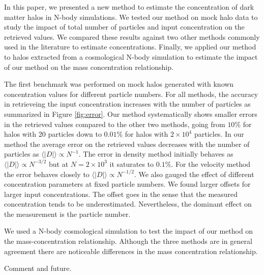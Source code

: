 \documentclass{emulateapj}
\begin{document}
In this paper, we presented a new method to estimate the
concentration of dark matter halos in N-body simulations. 
We tested our method on mock halo data to study the impact of total
number of particles and input concentration on the retrieved values.
We compared these results against two other methods commonly used in
the literature to estimate concentrations.
Finally, we applied our method to halos extracted from a cosmological
N-body simulation to estimate the impact of our method on the mass
concentration relationship. 


The first benchmark was performed on mock halos generated with known
concentration values for different particle numbers. 
For all methods, the accuracy in retrieveing the input concentration
increases with the number of particles as summarized in Figure \ref{fig:error}.
Our method systematically shows smaller errors in the retrieved values
compared to the other two methods, going from $10\%$ for halos with
$20$ particles down to $0.01\%$ for halos with $2\times 10^4$ particles. 
In our method the average error on the retrieved values decreases with
the number of particles as $\langle|D|\rangle\propto N^{-1}$.
The error in density method initially behaves as $\langle|D|\rangle\propto
N^{-3/2}$ but at $N=2\times 10^3$ it saturates to $0.1\%$. 
For the velocity method the error behaves closely to
$\langle|D|\rangle\propto N^{-1/2}$.
We also gauged the effect of different concentration parameters at
fixed particle numbers. 
We found larger offsets for larger input concentrations. 
The offset goes in the sense that the measured concentration tends to
be underestimated.
Nevertheless, the dominant effect on the measurement is the particle
number.

We used a N-body cosmological simulation to test the impact of our
method on the mass-concentration relationship.
Although the three methods are in general agreement there are
noticeable differences in the mass concentration relationship.


Comment and future.\\





\appendix
\end{document}
